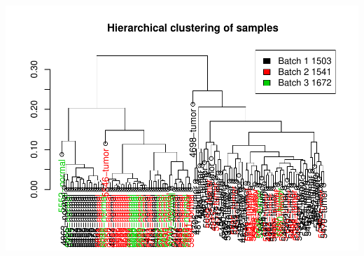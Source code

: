 \documentclass[]{article}
\begin{document}
\includegraphics{IEO_project_files/figure-latex/Hierarchical clustering according to batch effect-2.pdf}
\end{document}
